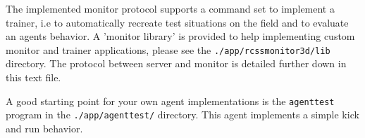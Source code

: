 The implemented monitor protocol supports a command set to implement a
trainer, i.e to automatically recreate test situations on the field
and to evaluate an agents behavior. A 'monitor library' is provided to
help implementing custom monitor and trainer applications, please see
the \texttt{./app/rcssmonitor3d/lib} directory. The protocol between
server and monitor is detailed further down in this text file.

A good starting point for your own agent implementations is the
\texttt{agenttest} program in the \texttt{./app/agenttest/} directory.
This agent implements a simple kick and run behavior.

